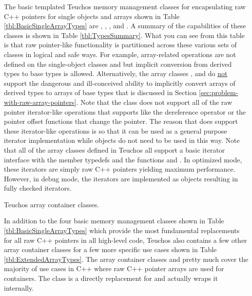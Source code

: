 \documentclass[pdf,ps2pdf,11pt]{SANDreport}
\begin{document}
The basic templated Teuchos memory management classes for
encapsulating raw C++ pointers for single objects and arrays shown in
Table {}\ref{tbl:BasicSingleArrayTypes} are {}, {},
{}, and {}.  A summary of the
capabilities of these classes is shown in Table
{}\ref{tbl:TypesSummary}.  What you can see from this table is that
raw pointer-like functionality is partitioned across these various
sets of classes in logical and safe ways.  For example, array-related
operations are not defined on the single-object classes {}
and {} but implicit conversion from derived types to base
types is allowed.  Alternatively, the array classes {},
and {} do {}\underline{not} support the dangerous and
ill-conceived ability to implicitly convert arrays of derived types to
arrays of base types that is discussed in Section
{}\ref{sec:problem-with-raw-array-pointers}.  Note that the class
{} does not support all of the raw pointer
iterator-like operations that {} supports like the
dereference operator {} or the pointer offset
functions that change the pointer.  The reason that {}
does support these iterator-like operations is so that it can be used
as a general purpose iterator implementation while {}
objects do not need to be used in this way.  Note that all of the
array classes defined in Teuchos all support a basic iterator
interface with the {} member typedefs and the
functions {} and {}.  In optimized mode, these
iterators are simply raw C++ pointers yielding maximum performance.
However, in debug mode, the iterators are implemented as
{} objects resulting in fully checked iterators.

\begin{table}
\begin{center}

\end{center}
\caption{\label{tbl:ExtendedArrayTypes}
Teuchos array container classes.}
\end{table}

In addition to the four basic memory management classes shown in Table
{}\ref{tbl:BasicSingleArrayTypes} which provide the most fundamental
replacements for all raw C++ pointers in all high-level code, Teuchos
also contains a few other array container classes for a few more
specific use cases shown in Table {}\ref{tbl:ExtendedArrayTypes}.  The
array container classes {} and {} pretty much
cover the majority of use cases in C++ where raw C++ pointer arrays
are used for containers.  The class {} is a directly
replacement for {} and actually wraps it internally.
\end{document}
